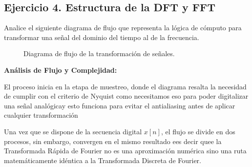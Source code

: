 \subsection*{Ejercicio 4. Estructura de la DFT y FFT}

Analice el siguiente diagrama de flujo que representa la lógica de cómputo para transformar una señal del dominio del tiempo al de la frecuencia.

\begin{figure}[H]
    \centering
    \caption{Diagrama de flujo de la transformación de señales.}
    \label{fig:diagrama_fft}
\end{figure}

\vspace{0.5cm}

\textbf{Análisis de Flujo y Complejidad:}

El proceso inicia en la etapa de muestreo, donde el diagrama resalta la necesidad de cumplir con el criterio de Nyquist como necesitamos eso para poder digitalizar una señal analógicay esto funciona para evitar el antialiasing antes de aplicar cualquier transformación

Una vez que se dispone de la secuencia digital $x[n]$, el flujo se divide en dos procesos, sin embargo, convergen en el mismo resultado ees decir quee la Transformada Rápida de Fourier no es una aproximación numérica sino una ruta matemáticamente idéntica a la Transformada Discreta de Fourier.

